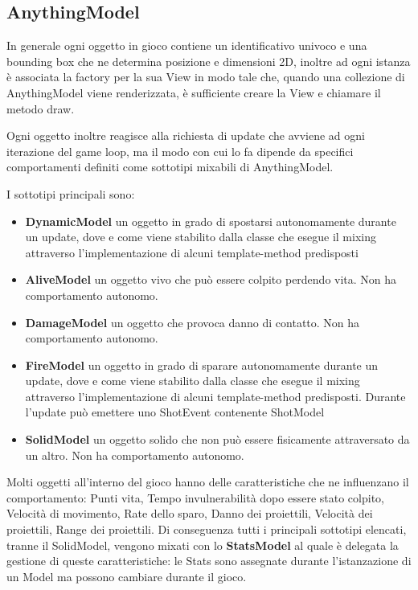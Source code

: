 \subsection{AnythingModel}
In generale ogni oggetto in gioco contiene un identificativo univoco e una bounding box che ne determina posizione e dimensioni 2D, inoltre ad ogni istanza è associata la factory per la sua View in modo tale che, quando una collezione di AnythingModel viene renderizzata, è sufficiente creare la View e chiamare il metodo draw. 

Ogni oggetto inoltre reagisce alla richiesta di update che avviene ad ogni iterazione del game loop, ma il modo con cui lo fa dipende da specifici comportamenti definiti come sottotipi mixabili di AnythingModel.

I sottotipi principali sono:
\begin{itemize}
    \item \textbf{DynamicModel} un oggetto in grado di spostarsi autonomamente durante un update, dove e come viene stabilito dalla classe che esegue il mixing attraverso l'implementazione di alcuni template-method predisposti
    \item \textbf{AliveModel} un oggetto vivo che può essere colpito perdendo vita. Non ha comportamento autonomo.
    \item \textbf{DamageModel} un oggetto che provoca danno di contatto. Non ha comportamento autonomo.
    \item \textbf{FireModel} un oggetto in grado di sparare autonomamente durante un update, dove e come viene stabilito dalla classe che esegue il mixing attraverso l'implementazione di alcuni template-method predisposti. Durante l'update può emettere uno ShotEvent contenente ShotModel
    \item \textbf{SolidModel} un oggetto solido che non può essere fisicamente attraversato da un altro. Non ha comportamento autonomo.
\end{itemize}

Molti oggetti all'interno del gioco hanno delle caratteristiche che ne influenzano il comportamento: 
Punti vita, Tempo invulnerabilità dopo essere stato colpito, Velocità di movimento, Rate dello sparo, Danno dei proiettili, Velocità dei proiettili, Range dei proiettili. 
Di conseguenza tutti i principali sottotipi elencati, tranne il SolidModel, vengono mixati con lo \textbf{StatsModel} al quale è delegata la gestione di queste caratteristiche: le Stats sono assegnate durante l'istanzazione di un Model ma possono cambiare durante il gioco.

